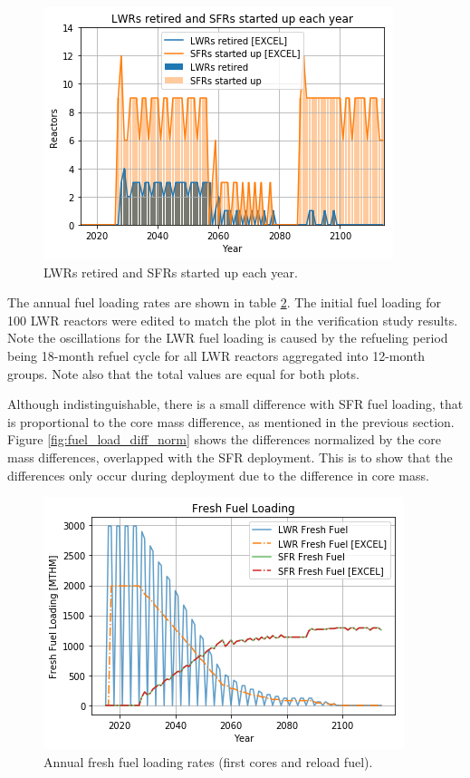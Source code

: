 \begin{figure}[htbp!]
	\begin{center}
		\includegraphics[scale=0.6]{./images/results_18/dep.png}
	\end{center}
        \caption{\glspl{LWR} retired and \glspl{SFR} started up each year.}
	\label{fig:dep}
\end{figure}


The annual fuel loading rates are shown in table \ref{fig:fuel_load}.
The initial fuel loading for 100 \gls{LWR} reactors were edited to match
the plot in the verification
study results. Note the oscillations for the \gls{LWR} fuel loading
is caused by the refueling period being 18-month refuel cycle for all \gls{LWR} reactors
aggregated into 12-month groups. Note also that the total values
are equal for both plots.

Although indistinguishable,
there is a small difference with \gls{SFR} fuel loading, that is proportional
to the core mass difference, as mentioned in the previous section.
Figure \ref{fig:fuel_load_diff_norm} shows the
differences normalized by the core mass differences, overlapped with the
\gls{SFR} deployment. This is to show that the differences only occur during
deployment due to the difference in core mass.


\begin{figure}[htbp!]
    \begin{center}
        \includegraphics[scale=0.6]{./images/results_18/fuel_load.png}
    \end{center}
        \caption{Annual fresh fuel loading rates (first cores and reload fuel).}
    \label{fig:fuel_load}
\end{figure}


